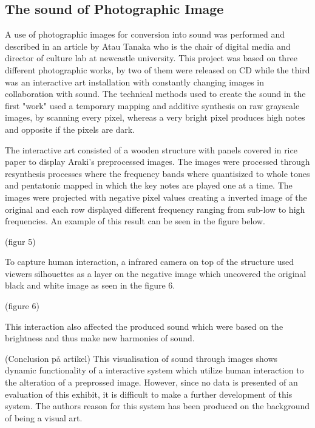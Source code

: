 \subsection{The sound of Photographic Image}\label{sec:soundarticle}

A use of photographic images for conversion into sound was performed and described in an article by Atau Tanaka who is the chair of digital media and director of culture lab at newcastle university. This project was based on three different photographic works, by two of them were released on CD while the third was an interactive art installation with constantly changing images in collaboration with sound. The technical methods used to create the sound in the first "work" used a temporary mapping and additive synthesis on raw grayscale images, by scanning every pixel, whereas a very bright pixel produces high notes and opposite if the pixels are dark. 

The interactive art consisted of a wooden structure with panels covered in rice paper to display Araki's preprocessed images. The images were processed through resynthesis processes where the frequency bands where quantisized to whole tones and pentatonic mapped in which the key notes are played one at a time. The images were projected with negative pixel values creating a inverted image of the original and each row displayed different frequency ranging from sub-low to high frequencies. An example of this result can be seen in the figure below. 

(figur 5)

To capture human interaction, a infrared camera on top of the structure used viewers silhouettes as a layer on the negative image which uncovered the original black and white image as seen in the figure 6.

(figure 6)

This interaction also affected the produced sound which were based on the brightness and thus make new harmonies of sound. 

(Conclusion på artikel)
This visualisation of sound through images shows dynamic functionality of a interactive system which utilize human interaction to the alteration of a preprossed image. However, since no data is presented of an evaluation of this exhibit, it is difficult to make a further development of this system. The authors reason for this system has been produced on the background of being a visual art.            
 

